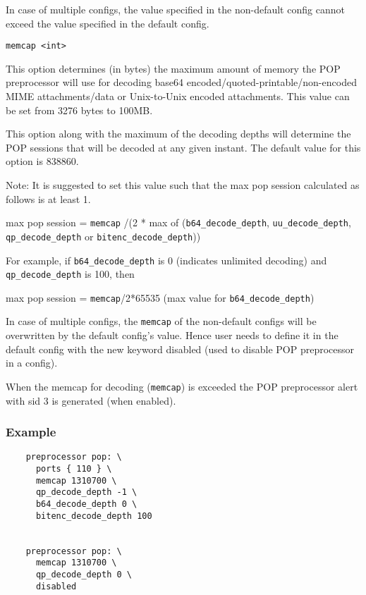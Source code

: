 \documentclass[english]{report}
\newcounter{slistnum}
\newenvironment{slist}
{ \begin{list}{ {\bf \arabic{slistnum}.} }{\usecounter{slistnum} } }
{ \end{list} }
\begin{document}
\begin{slist}
In case of multiple configs, the value specified in the non-default config cannot exceed
the value specified in the default config.

\item \texttt{memcap <int>}

This option determines (in bytes) the maximum amount of memory the POP preprocessor
will use for decoding base64 encoded/quoted-printable/non-encoded MIME attachments/data
or Unix-to-Unix encoded attachments. This value can be set from 3276 bytes to 100MB.

This option along with the maximum of the decoding depths will determine the POP 
sessions that will be decoded at any given instant. The default value for this option
is 838860.

Note: It is suggested to set this value such that the max pop session calculated as
follows is at least 1.

max pop session = \texttt{memcap} /(2 * max of (\texttt{b64\_decode\_depth},
                                        \texttt{uu\_decode\_depth}, \texttt{qp\_decode\_depth}
                                        or \texttt{bitenc\_decode\_depth}))

For example, if \texttt{b64\_decode\_depth} is 0 (indicates unlimited decoding) and
\texttt{qp\_decode\_depth} is 100, then

max pop session = \texttt{memcap}/2*65535 (max value for \texttt{b64\_decode\_depth})

In case of multiple configs, the \texttt{memcap} of the non-default configs will be overwritten by the
default config's value. Hence user needs to define it in the default config with the new keyword
disabled (used to disable POP preprocessor in a config).

When the memcap for decoding (\texttt{memcap}) is exceeded the POP preprocessor alert with sid 3 is
generated (when enabled).

\end{slist}

\subsubsection{Example}

\begin{verbatim}
	preprocessor pop: \
	  ports { 110 } \
	  memcap 1310700 \
	  qp_decode_depth -1 \
	  b64_decode_depth 0 \
	  bitenc_decode_depth 100


	preprocessor pop: \
	  memcap 1310700 \
	  qp_decode_depth 0 \
	  disabled
\end{verbatim}
\end{document}
